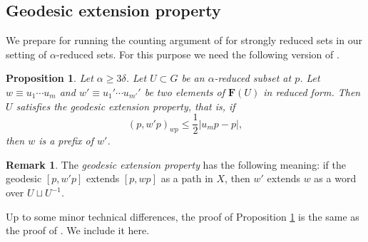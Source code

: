 \documentclass[leqno,a4paper,10pt]{amsart}
\theoremstyle{plain}
\newtheorem{prop}[thm]{Proposition}
\theoremstyle{definition}
\newtheorem{rem}[thm]{Remark}
\theoremstyle{remark}
\newcommand{\F}{\mathbf{F}}
\begin{document}
\subsection{Geodesic extension property}

We prepare for running the counting argument of \cite[Section 3]{coulon_product_2022} for strongly reduced sets in our setting of $\alpha$-reduced sets. For this purpose we need the following version of \cite[Lemma~3.2]{coulon_product_2022}. 

\begin{prop}
	\label{prop:geodesic extension property} Let $\alpha\geqslant 3\delta$. 
Let $U\subset G$ be an $\alpha$-reduced subset at $p$. Let $w\equiv u_1\cdots u_m$ and $w'\equiv u_1'\cdots u_{m'}'$ be two elements of $\F(U)$ in reduced form. Then $U$ satisfies the geodesic extension property, that is, if $$(p,w'p)_{wp}\leqslant \frac{1}{2}|u_mp-p|,$$
	then $w$ is a prefix of $w'$.
\end{prop}

\begin{rem}
The \emph{geodesic extension property} has the following meaning: if the geodesic $[p,w'p]$ extends $[p,wp]$ as a path in $X$, then $w'$ extends $w$ as a word over $U\sqcup U^{-1}$.
\end{rem}

Up to some minor technical differences, the proof of Proposition \ref{prop:geodesic extension property} is the same as the proof of \cite[Lemma~3.2]{coulon_product_2022}. We include it here. 
\end{document}
